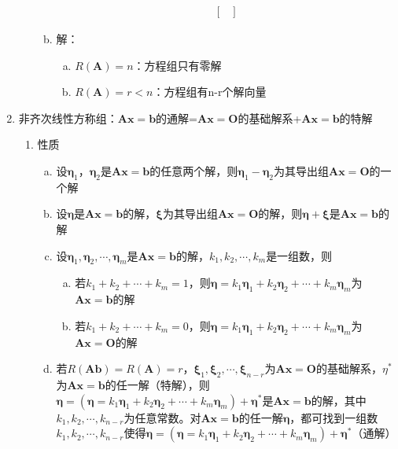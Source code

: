 \documentclass[12pt]{book}
\begin{document}
\begin{enumerate}[1.]
\begin{enumerate}[(1)]
\begin{enumerate}[a.]
\begin{gather*}
\begin{bmatrix}
                                  \end{bmatrix}
                              \end{gather*}
                        \item 解：
                              \begin{enumerate}[(a)]
                                  \item $R(\bm{A})=n$：方程组只有零解
                                  \item $R(\bm{A})=r<n$：方程组有n-r个解向量
                              \end{enumerate}
                    \end{enumerate}
          \end{enumerate}
    \item 非齐次线性方称组：$\bm{Ax}=\bm{b}$的通解=$\bm{Ax}=\bm{O}$的基础解系+$\bm{Ax}=\bm{b}$的特解
          \begin{enumerate}[(1)]
              \item 性质
                    \begin{enumerate}[a.]
                        \item 设$\bm{\eta}_1$，$\bm{\eta}_2$是$\bm{Ax}=\bm{b}$的任意两个解，则$\bm{\eta}_1-\bm{\eta}_2$为其导出组$\bm{Ax}=\bm{O}$的一个解
                        \item 设$\bm{\eta}$是$\bm{Ax}=\bm{b}$的解，$\bm{\xi}$为其导出组$\bm{Ax}=\bm{O}$的解，则$\bm{\eta}+\bm{\xi}$是$\bm{Ax}=\bm{b}$的解
                        \item 设$\bm{\eta}_1,\bm{\eta}_2,\cdots,\bm{\eta}_m$是$\bm{Ax}=\bm{b}$的解，$k_1,k_2,\cdots,k_m$是一组数，则
                              \begin{enumerate}[(a)]
                                  \item 若$k_1+k_2+\cdots+k_m=1$，则$\bm{\eta}=k_{1} \bm{\eta}_1 + k_2 \bm{\eta}_2+\cdots+k_m \bm{\eta}_m$为$\bm{Ax}=\bm{b}$的解
                                  \item 若$k_1+k_2+\cdots+k_m=0$，则$\bm{\eta}=k_1 \bm{\eta}_1 + k_2 \bm{\eta}_2+\cdots+k_m \bm{\eta}_m$为$\bm{Ax}=\bm{O}$的解
                              \end{enumerate}
                        \item 若$R(\bm{A b})=R(\bm{A})=r$，$\bm{\xi}_1,\bm{\xi}_2,\cdots,\bm{\xi}_{n-r}$为$\bm{Ax}=\bm{O}$的基础解系，$\eta^{*}$为$\bm{Ax}=\bm{b}$的任一解（特解），则$\bm{\eta}=(\bm{\eta}=k_1 \bm{\eta}_1 + k_2 \bm{\eta}_2+\cdots+k_m \bm{\eta}_m)+\bm{\eta}^{*}$是$\bm{Ax}=\bm{b}$的解，其中$k_1,k_2,\cdots,k_{n-r}$为任意常数。对$\bm{Ax}=\bm{b}$的任一解$\bm{\eta}$，都可找到一组数$k_1,k_2,\cdots,k_{n-r}$使得$\bm{\eta}=(\bm{\eta}=k_1 \bm{\eta}_1 + k_2 \bm{\eta}_2+\cdots+k_m \bm{\eta}_m)+\bm{\eta}^{*}$（通解）

\end{enumerate}
\end{enumerate}
\end{enumerate}
\end{document}
